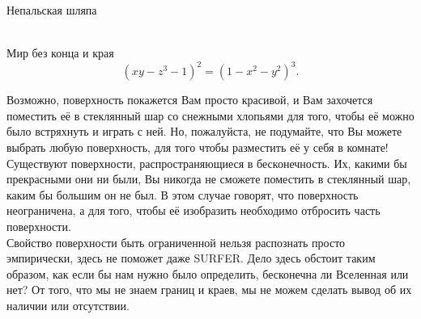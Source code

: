 \documentclass[ru]{./../../common/SurferDesc}%
\begin{document}
\footnotesize

\begin{surferPage}
  \begin{surferTitle}Непальская шляпа\end{surferTitle}  \\
Мир без конца и края \\

\smallskip
\[(x y - z^3 -1)^2= (1 - x^2	- y^2)^3.\]

\singlespacing
Возможно, поверхность покажется Вам просто красивой, и Вам захочется поместить её в стеклянный шар со снежными хлопьями для того, чтобы её можно было встряхнуть и играть с ней. Но, пожалуйста, не подумайте, что Вы можете выбрать любую поверхность, для того чтобы разместить её у себя в комнате!
\\
\singlespacing
Существуют поверхности, распространяющиеся в бесконечность. Их, какими бы прекрасными они ни были, Вы никогда не сможете поместить в стеклянный шар, каким бы большим он не был. В этом случае говорят, что поверхность неограничена, а для того, чтобы её изобразить необходимо отбросить часть поверхности.
\\
\singlespacing
Свойство поверхности быть ограниченной нельзя распознать просто эмпирически, здесь не поможет даже SURFER. Дело здесь обстоит таким образом, как если бы нам нужно было определить, бесконечна ли Вселенная или нет? От того, что мы не знаем границ и краев, мы не можем сделать вывод об их наличии или отсутствии.
  \begin{surferText}
     \end{surferText}
\end{surferPage}
\end{document}
